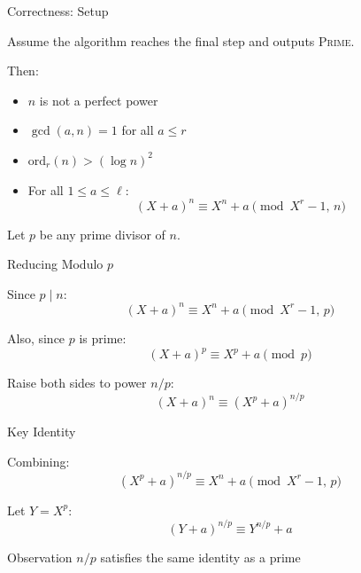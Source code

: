 \documentclass{beamer}
\begin{document}

\begin{frame}{Correctness: Setup}

Assume the algorithm reaches the final step and outputs \textsc{Prime}.

\vspace{0.5em}

Then:
\begin{itemize}
    \item $n$ is not a perfect power
    \item $\gcd(a,n)=1$ for all $a \le r$
    \item $\mathrm{ord}_r(n) > (\log n)^2$
    \item For all $1 \le a \le \ell$:
\[
(X+a)^n \equiv X^n + a \pmod{X^r-1,\, n}
\]
\end{itemize}

\vspace{0.5em}

Let $p$ be any prime divisor of $n$.

\end{frame}


\begin{frame}{Reducing Modulo $p$}

Since $p \mid n$:
\[
(X+a)^n \equiv X^n + a \pmod{X^r-1,\, p}
\]


Also, since $p$ is prime:
\[
(X+a)^p \equiv X^p + a \pmod{p}
\]


Raise both sides to power $n/p$:
\[
(X+a)^n \equiv (X^p + a)^{n/p}
\]

\end{frame}


\begin{frame}{Key Identity}

Combining:
\[
(X^p + a)^{n/p} \equiv X^n + a \pmod{X^r-1,\, p}
\]


Let $Y = X^p$:
\[
(Y + a)^{n/p} \equiv Y^{n/p} + a
\]


\begin{block}{Observation}
$n/p$ satisfies the same identity as a prime
\end{block}

\end{frame}

\end{document}
